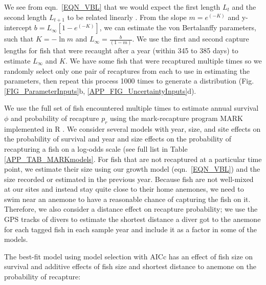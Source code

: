 \documentclass[12pt, oneside]{article}   	%
\begin{document}
We see from eqn.\ \ref{EQN_VBL} that we would expect the first length $L_t$ and the second length $L_{t+1}$ to be related linearly \citep{hart2009estimating}. From the slope $m = e^{(-K)}$ and y-intercept $b =  L_\infty[1 - e^{(-K)}]$, we can estimate the von Bertalanffy parameters, such that $K = -\ln m$ and $L_\infty = \frac{b}{(1-m)}$. We use the first and second capture lengths for fish that were recaught after a year (within 345 to 385 days) to estimate $L_\infty$ and $K$. We have some fish that were recaptured multiple times so we randomly select only one pair of recaptures from each to use in estimating the parameters, then repeat this process 1000 times to generate a distribution (Fig. \ref{FIG_ParameterInputs}b, \ref{APP_FIG_UncertaintyInputs}d). 

We use the full set of fish encountered multiple times to estimate annual survival $\phi$ and probability of recapture $p_r$ using the mark-recapture program MARK implemented in R \citep{RMark_Laake2013}. We consider several models with year, size, and site effects on the probability of survival and year and size effects on the probability of recapturing a fish on a log-odds scale (see full list in Table \ref{APP_TAB_MARKmodels}. For fish that are not recaptured at a particular time point, we estimate their size using our growth model (eqn.\ \ref{EQN_VBL}) and the size recorded or estimated in the previous year. Because fish are not well-mixed at our sites and instead stay quite close to their home anemones, we need to swim near an anemone to have a reasonable chance of capturing the fish on it. Therefore, we also consider a distance effect on recapture probability; we use the GPS tracks of divers to estimate the shortest distance a diver got to the anemone for each tagged fish in each sample year and include it as a factor in some of the models.

The best-fit model using model selection with AICc has an effect of fish size on survival and additive effects of fish size and shortest distance to anemone on the probability of recapture:

\end{document}
